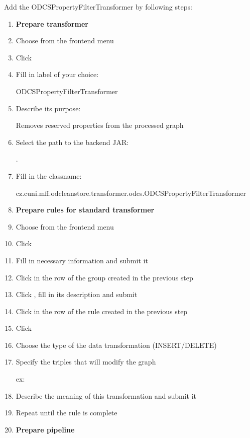 Add the ODCSPropertyFilterTransformer by following steps:

\begin{enumerate}
	\item[] \textbf{Prepare transformer}
	\item Choose  from the frontend menu
	\item Click 
	\item Fill in label of your choice:
	
	ODCSPropertyFilterTransformer
	
	\item Describe its purpose:
	
	Removes reserved properties from the processed graph
	
	\item Select the path to the backend JAR:
	
	.
	
	\item Fill in the classname:
	
	cz.cuni.mff.odcleanstore.transformer.odcs.ODCSPropertyFilterTransformer
	
	\item[] \textbf{Prepare rules for standard transformer}
	\item Choose  from the frontend menu
	\item Click 
	\item Fill in necessary information and submit it
	\item Click  in the row of the group created in the previous step
	\item Click , fill in its description and submit
	\item Click  in the row of the rule created in the previous step
	\item Click 
	\item Choose the type of the data transformation (INSERT/DELETE)
	\item Specify the triples that will modify the graph
	
	ex: 
	
	\item Describe the meaning of this transformation and submit it
	\item Repeat until the rule is complete
	
	\item[] \textbf{Prepare pipeline}
	
	
	

\end{enumerate}


